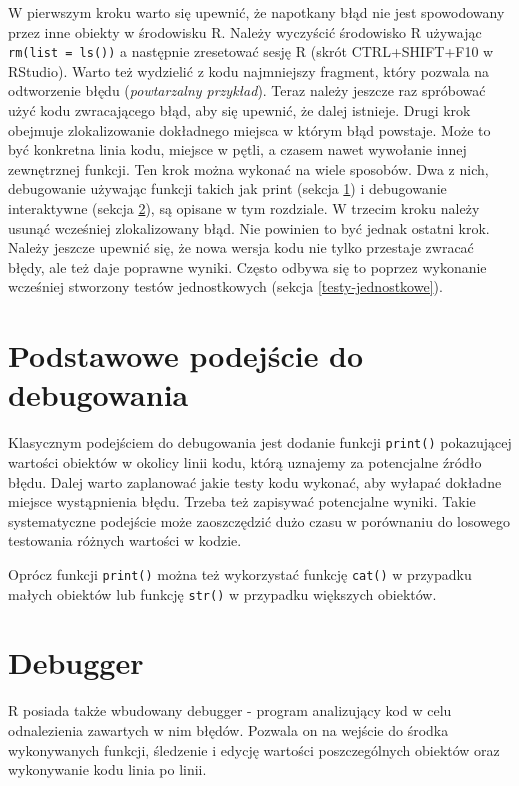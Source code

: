 \documentclass[paper=6in:9in,pagesize=pdftex,headinclude=on,footinclude=on,10pt]{scrbook}
\begin{document}
W pierwszym kroku warto się upewnić, że napotkany błąd nie jest spowodowany przez inne obiekty w środowisku R.
Należy wyczyścić środowisko R używając \texttt{rm(list\ =\ ls())} a następnie zresetować sesję R (skrót CTRL+SHIFT+F10 w RStudio).
Warto też wydzielić z kodu najmniejszy fragment, który pozwala na odtworzenie błędu (\emph{powtarzalny przykład}).
Teraz należy jeszcze raz spróbować użyć kodu zwracającego błąd, aby się upewnić, że dalej istnieje.
Drugi krok obejmuje zlokalizowanie dokładnego miejsca w którym błąd powstaje.
Może to być konkretna linia kodu, miejsce w pętli, a czasem nawet wywołanie innej zewnętrznej funkcji.
Ten krok można wykonać na wiele sposobów.
Dwa z nich, debugowanie używając funkcji takich jak print (sekcja \ref{debuging-print}) i debugowanie interaktywne (sekcja \ref{debugger}), są opisane w tym rozdziale.
W trzecim kroku należy usunąć wcześniej zlokalizowany błąd.
Nie powinien to być jednak ostatni krok.
Należy jeszcze upewnić się, że nowa wersja kodu nie tylko przestaje zwracać błędy, ale też daje poprawne wyniki.
Często odbywa się to poprzez wykonanie wcześniej stworzony testów jednostkowych (sekcja \ref{testy-jednostkowe}).

\hypertarget{debuging-print}{%
\section{Podstawowe podejście do debugowania}\label{debuging-print}}

Klasycznym podejściem do debugowania jest dodanie funkcji \texttt{print()} pokazującej wartości obiektów w okolicy linii kodu, którą uznajemy za potencjalne źródło błędu.
Dalej warto zaplanować jakie testy kodu wykonać, aby wyłapać dokładne miejsce wystąpnienia błędu.
Trzeba też zapisywać potencjalne wyniki.
Takie systematyczne podejście może zaoszczędzić dużo czasu w porównaniu do losowego testowania różnych wartości w kodzie.

Oprócz funkcji \texttt{print()} można też wykorzystać funkcję \texttt{cat()} w przypadku małych obiektów lub funkcję \texttt{str()} w przypadku większych obiektów.

\hypertarget{debugger}{%
\section{Debugger}\label{debugger}}

R posiada także wbudowany debugger - program analizujący kod w celu odnalezienia zawartych w nim błędów.
Pozwala on na wejście do środka wykonywanych funkcji, śledzenie i edycję wartości poszczególnych obiektów oraz wykonywanie kodu linia po linii.
\end{document}
